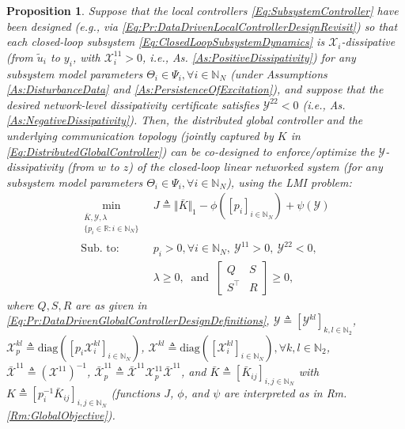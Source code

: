 \documentclass[letterpaper, 10 pt, conference]{ieeeconf}%
\newcommand{\R}{\mathbb{R}}
\newcommand{\N}{\mathbb{N}}
\newcommand{\T}{\top}
\newcommand{\0}{\mathbf{0}}
\newcommand{\X}{\mathcal{X}}
\newcommand{\Y}{\mathcal{Y}}
\newcommand{\diag}{\text{diag}}
\newcommand{\bm}[1]{\begin{bmatrix}#1\end{bmatrix}}
\newtheorem{proposition}{\textbf{Proposition}}
\begin{document}
\begin{proposition}\label{Pr:DataDrivenGlobalControllerDesign}
Suppose that the local controllers \eqref{Eq:SubsystemController} have been designed (e.g., via \eqref{Eq:Pr:DataDrivenLocalControllerDesignRevisit}) so that each closed-loop subsystem \eqref{Eq:ClosedLoopSubsystemDynamics} is $\X_i$-dissipative (from $\tilde{u}_i$ to $y_i$, with $\X_i^{11}>0$, i.e., As. \ref{As:PositiveDissipativity}) for any subsystem model parameters $\Theta_i \in \Psi_i, \forall i\in \N_N$ (under Assumptions \ref{As:DisturbanceData} and \ref{As:PersistenceOfExcitation}), and suppose that the desired network-level dissipativity certificate satisfies $\Y^{22}<0$ (i.e., As. \ref{As:NegativeDissipativity}). Then, the distributed global controller and the underlying communication topology  (jointly captured by $K$ in \eqref{Eq:DistributedGlobalController}) can be co-designed to enforce/optimize the $\Y$-dissipativity (from $w$ to $z$) of the closed-loop linear networked system (for any subsystem model parameters $\Theta_i \in \Psi_i, \forall i\in \N_N$), using the LMI problem:     
\begin{equation}\label{Eq:Pr:DataDrivenGlobalControllerDesign}
\begin{aligned}
\min_{\substack{\bar{K}, \Y, \lambda \\ \{p_i\in\R: i\in\N_N\}}}&\ J \triangleq \Vert \bar{K} \Vert_1 - \phi([p_i]_{i\in\N_N}) + \psi(\Y)\\
\mbox{Sub. to:}&\ p_i > 0, \forall i\in\N_N,\ \Y^{11}>0,\ \Y^{22}<0,\\
&\ \lambda \geq 0,\ \mbox{ and } \ \bm{Q & S \\ S^\T & R} \geq 0,
\end{aligned}    
\end{equation}
where $Q,S,R$ are as given in \eqref{Eq:Pr:DataDrivenGlobalControllerDesignDefinitions}, 
$\Y \triangleq [\Y^{kl}]_{k,l\in\N_2}$, 
$\X_p^{kl} \triangleq \diag([p_i\X_i^{kl}]_{i\in\N_N})$,
$\X^{kl} \triangleq \diag([\X^{kl}_i]_{i\in\N_N}), \forall k,l\in\N_2$,
$\bar{\X}^{11} \triangleq (\X^{11})^{-1}$, 
$\bar{\X}_p^{11} \triangleq \bar{\X}^{11} \X_p^{11} \bar{\X}^{11}$, 
and $\bar{K} \triangleq [\bar{K}_{ij}]_{i,j\in\N_N}$ with $K \triangleq [p_i^{-1} \bar{K}_{ij}]_{i,j\in\N_N}$ (functions $J$, $\phi$, and $\psi$ are interpreted as in Rm. \ref{Rm:GlobalObjective}).
\end{proposition}
\end{document}
